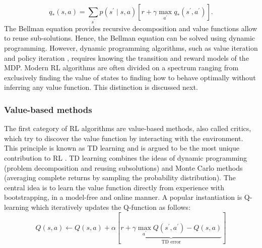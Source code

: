 \documentclass[\home/main.tex]{subfiles}
\begin{document}
\begin{equation}
	q_{*}(s, a)=\sum_{s^{\prime}} p\left(s^{\prime} \mid s, a\right)\left[r+\gamma \max _{a^{\prime}} q_{*}\left(s^{\prime}, a^{\prime}\right)\right].
\end{equation}
The Bellman equation provides recursive decomposition and value functions allow to reuse sub-solutions. Hence, the Bellman equation can be solved using dynamic programming. However, dynamic programming algorithms, such as value iteration and policy iteration \autocite{Sutton2018}, requires knowing the transition and reward models of the MDP. Modern RL algorithms are often divided on a spectrum ranging from exclusively finding the value of states to finding how to behave optimally without inferring any value function. This distinction is discussed next.

\subsubsection{Value-based methods}
The first category of RL algorithms are value-based methods, also called critics, which try to discover the value function by interacting with the environment. This principle is known as \gls{TD} learning \autocite{boyan2002technical} and is argued to be the most unique contribution to RL \autocite{Sutton2018}. \gls{TD} learning combines the ideas of dynamic programming (problem decomposition and reusing subsolutions) and Monte Carlo methods (averaging complete returns by sampling the probability distribution). The central idea is to learn the value function directly from experience with bootstrapping, in a model-free and online manner. A popular instantiation is Q-learning \autocite{watkins1992q} which iteratively updates the Q-function as follows:
\begin{equation} \label{eq:q-learning-update-rule}
	Q(s, a) \leftarrow Q(s, a)+\alpha\left[\underbrace{r+\gamma \max _{a^{\prime}} Q\left(s^{\prime}, a^{\prime}\right)-Q(s, a)}_{\text{TD error}}\right]
\end{equation}
\end{document}
